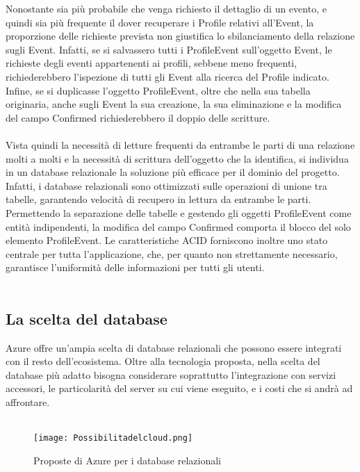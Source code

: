 Nonostante sia più probabile che venga richiesto il dettaglio di un evento, e quindi sia più frequente il dover recuperare i Profile relativi all’Event, 
la proporzione delle richieste prevista non giustifica lo sbilanciamento della relazione sugli Event.
Infatti, se si salvassero tutti i ProfileEvent sull’oggetto Event, le richieste degli eventi appartenenti ai profili, sebbene meno frequenti, 
richiederebbero l’ispezione di tutti gli Event alla ricerca del Profile indicato. 
Infine, se si duplicasse l’oggetto ProfileEvent, oltre che nella sua tabella originaria, anche sugli Event la sua creazione, 
la sua eliminazione e la modifica del campo Confirmed richiederebbero il doppio delle scritture.\\
\\
Vista quindi la necessità di letture frequenti da entrambe le parti di una relazione molti a molti e la necessità di scrittura dell’oggetto che la identifica, 
si individua in un database relazionale la soluzione più efficace per il dominio del progetto. 
Infatti, i database relazionali sono ottimizzati sulle operazioni di unione tra tabelle, garantendo velocità di recupero in lettura da entrambe le parti. 
Permettendo la separazione delle tabelle e gestendo gli oggetti ProfileEvent come entità indipendenti, 
la modifica del campo Confirmed comporta il blocco del solo elemento ProfileEvent. 
Le caratteristiche ACID forniscono inoltre uno stato centrale per tutta l’applicazione, che, 
per quanto non strettamente necessario, garantisce l’uniformità delle informazioni per tutti gli utenti.\\
\\

\clearpage
\subsection{La scelta del database}

Azure offre un’ampia scelta di database relazionali che possono essere integrati con il resto dell’ecosistema. 
Oltre alla tecnologia proposta, nella scelta del database più adatto bisogna considerare soprattutto l’integrazione con servizi accessori, 
le particolarità del server su cui viene eseguito, e i costi che si andrà ad affrontare.\\
\\
\begin{figure}[h!]
    \centering
    \texttt{[image: Possibilitadelcloud.png]}
    \caption{Proposte di Azure per i database relazionali}
\end{figure}	


